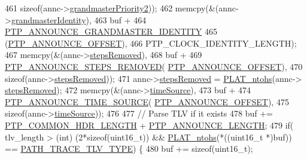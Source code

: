 \begin{DoxyCode}
{{{{{{{{461                    \textcolor{keyword}{sizeof}(annc->\hyperlink{class_p_t_p_message_announce_a1e9e3c7867bf9eb557e5cf6edbd7f54a}{grandmasterPriority2}));
462             memcpy(&(annc->\hyperlink{class_p_t_p_message_announce_aac45d13272e7f5bd9b06d2bf44c012af}{grandmasterIdentity}),
463                    buf +
464                    \hyperlink{avbts__message_8hpp_a822a74880e223c13025df7bbfa545b63}{PTP\_ANNOUNCE\_GRANDMASTER\_IDENTITY}
465                    (\hyperlink{avbts__message_8hpp_aaa3da4fa4e9e4cfe49477cd7f6b95bca}{PTP\_ANNOUNCE\_OFFSET}),
466                    PTP\_CLOCK\_IDENTITY\_LENGTH);
467             memcpy(&(annc->\hyperlink{class_p_t_p_message_announce_ab24df4cccbede4b07586878ef0d47395}{stepsRemoved}),
468                    buf +
469                    \hyperlink{avbts__message_8hpp_ad9e2d7ce4d1384fad376314924fa4cea}{PTP\_ANNOUNCE\_STEPS\_REMOVED}(
      \hyperlink{avbts__message_8hpp_aaa3da4fa4e9e4cfe49477cd7f6b95bca}{PTP\_ANNOUNCE\_OFFSET}),
470                    \textcolor{keyword}{sizeof}(annc->\hyperlink{class_p_t_p_message_announce_ab24df4cccbede4b07586878ef0d47395}{stepsRemoved}));
471             annc->\hyperlink{class_p_t_p_message_announce_ab24df4cccbede4b07586878ef0d47395}{stepsRemoved} = \hyperlink{linux_2src_2platform_8cpp_a6b8f3e7b87b66fa774a07ddc67f883a7}{PLAT\_ntohs}(annc->
      \hyperlink{class_p_t_p_message_announce_ab24df4cccbede4b07586878ef0d47395}{stepsRemoved});
472             memcpy(&(annc->\hyperlink{class_p_t_p_message_announce_a56fd97f48cb931b2450032650f82ef17}{timeSource}),
473                    buf +
474                    \hyperlink{avbts__message_8hpp_ac69e2a9341554bbbf10612cd50b5f181}{PTP\_ANNOUNCE\_TIME\_SOURCE}(
      \hyperlink{avbts__message_8hpp_aaa3da4fa4e9e4cfe49477cd7f6b95bca}{PTP\_ANNOUNCE\_OFFSET}),
475                    \textcolor{keyword}{sizeof}(annc->\hyperlink{class_p_t_p_message_announce_a56fd97f48cb931b2450032650f82ef17}{timeSource}));
476 
477             \textcolor{comment}{// Parse TLV if it exists}
478             buf += \hyperlink{avbts__message_8hpp_a8ec4d965b7b1e83844f1c17f12e9b8e4}{PTP\_COMMON\_HDR\_LENGTH} + 
      \hyperlink{avbts__message_8hpp_ad800b5cd5359d021054af8e902100ba7}{PTP\_ANNOUNCE\_LENGTH};
479             \textcolor{keywordflow}{if}( tlv\_length > (\textcolor{keywordtype}{int}) (2*\textcolor{keyword}{sizeof}(uint16\_t)) && \hyperlink{linux_2src_2platform_8cpp_a6b8f3e7b87b66fa774a07ddc67f883a7}{PLAT\_ntohs}(*((uint16\_t *)buf)) == 
      \hyperlink{avbts__message_8hpp_a10ec0e6a0943853c9deaf56616dbebf7}{PATH\_TRACE\_TLV\_TYPE})  \{
480                 buf += \textcolor{keyword}{sizeof}(uint16\_t);
}}}}}}}}
\end{DoxyCode}
